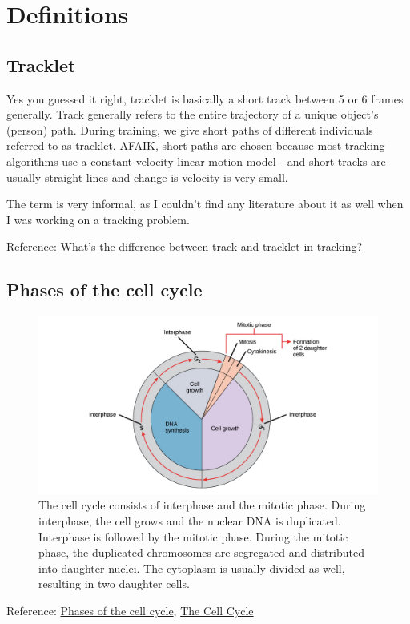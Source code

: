 \section{Definitions}
\subsection{Tracklet}
\label{def:tracklet}
Yes you guessed it right, tracklet is basically a short track between 5 or 6 frames generally. Track generally refers to the entire trajectory of a unique object's (person) path. During training, we give short paths of different individuals referred to as tracklet. AFAIK, short paths are chosen because most tracking algorithms use a constant velocity linear motion model - and short tracks are usually straight lines and change is velocity is very small.

The term is very informal, as I couldn't find any literature about it as well when I was working on a tracking problem.

Reference: \href{https://stackoverflow.com/questions/55512548/whats-the-difference-between-track-and-tracklet-in-tracking}{What's the difference between track and tracklet in tracking?}

\subsection{Phases of the cell cycle}
\begin{figure}[!htb]
    \centering
    \includegraphics[width=\textwidth]{figures/cell_cycle.png}
    \caption{The cell cycle consists of interphase and the mitotic phase. During interphase, the cell grows and the nuclear DNA is duplicated. Interphase is followed by the mitotic phase. During the mitotic phase, the duplicated chromosomes are segregated and distributed into daughter nuclei. The cytoplasm is usually divided as well, resulting in two daughter cells.}
    \label{fig:cellcycle}
\end{figure}
Reference: \href{https://www.khanacademy.org/science/biology/cellular-molecular-biology/mitosis/a/cell-cycle-phases}{Phases of the cell cycle}, \href{http://cnx.org/contents/185cbf87-c72e-48f5-b51e-f14f21b5eabd@9.87:52/The-Cell-Cycle}{The Cell Cycle}
